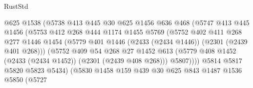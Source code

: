 \begin{lexlean}{RustStd}
\begin{coremodule}
{\begin{coremodule}
{{{{{{{{{{{{{                              @625
                              @1538
                              (@5738
                                @413
                                @445
                                @30
                                @625
                                @1456
                                @636
                                @468
                                (@5747
                                  @413
                                  @445
                                  @1456
                                  (@5753
                                    @412
                                    @268
                                    @444
                                    @1174
                                    @1455
                                    @5769
                                    (@5752
                                      @402
                                      @411
                                      @268
                                      @277
                                      @1446
                                      @1454
                                      (@5779
                                        @401
                                        @1446
                                        (@2433 (@2434 @1446))
                                        (@2301 (@2439 @401 @268)))
                                      (@5752
                                        @409
                                        @54
                                        @268
                                        @27
                                        @1452
                                        @613
                                        (@5779
                                          @408
                                          @1452
                                          (@2433 (@2434 @1452))
                                          (@2301 (@2439 @408 @268)))
                                        @5807))))
                                @5814
                                @5817
                                @5820
                                @5823
                                @5434)
                              (@5830
                                @1458
                                @159
                                @439
                                @30
                                @625
                                @843
                                @1487
                                @1536
                                @5850
                                (@5727
}}}}}}}}}}}}}
\end{coremodule}}
\end{coremodule}
\end{lexlean}
